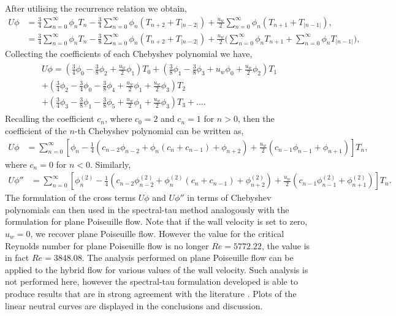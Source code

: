 \documentclass[a4paper, 12pt, twoside, openright]{article}
\numberwithin{equation}{section}
\begin{document}
After utilising the recurrence relation we obtain,
\begin{align}
U\phi &= \frac{3}{4}\sum_{n=0}^{\infty}\phi_n T_n - \frac{3}{4}\sum_{n=0}^{\infty}\phi_n\left(T_{n+2}+T_{|n-2|}\right)+\frac{u_w}{2}\sum_{n=0}^{\infty}\phi_n(T_{n+1}+T_{|n-1|})   , \\
 &= \frac{3}{4}\sum_{n=0}^{\infty}\phi_nT_n - \frac{3}{8}\sum_{n=0}^{\infty}\phi_n\left(T_{n+2}+T_{|n-2|}\right)+\frac{u_w}{2}\biggl(\sum_{n=0}^{\infty}\phi_nT_{n+1}+\sum_{n=0}^{\infty}\phi_nT_{|n-1|}\biggr) , 
\end{align}
Collecting the coefficients of each Chebyshev polynomial we have,
\begin{align}
\begin{split} 
U\phi = \left(\frac{3}{4}\phi_0 - \frac{3}{8}\phi_2+\frac{u_w}{2}\phi_1 \right)T_0 + \left(\frac{3}{8}\phi_1 - \frac{3}{8}\phi_3+ u_w\phi_0+\frac{u_w}{2}\phi_2\right)T_1 \\+ \left(\frac{3}{4}\phi_2 - \frac{3}{4}\phi_0 - \frac{3}{8}\phi_4 +\frac{u_w}{2}\phi_1+\frac{u_w}{2}\phi_3 \right)T_2 \\+ \left(\frac{3}{4}\phi_3 -\frac{3}{8}\phi_1 - \frac{3}{8}\phi_5 + \frac{u_w}{2}\phi_1 +\frac{u_w}{2}\phi_3 \right)T_3 + \dots.
\end{split}
\end{align}
Recalling the coefficient $c_n$, where $c_0=2$ and $c_n=1$ for $n>0$, then the coefficient of the $n$-th Chebyshev polynomial can be written as,  
\begin{align*}
U\phi &= \sum_{n=0}^{\infty} \left[\phi_n - \frac{1}{4}\left(c_{n-2}\phi_{n-2}+\phi_n\left(c_n + c_{n-1}\right) +\phi_{n+2}\right)+\frac{u_w}{2}\left(c_{n-1}\phi_{n-1}+\phi_{n+1}\right)\right]T_n,
\end{align*}
where $c_n=0$ for $n<0$. Similarly, 
\begin{align*}
U\phi'' &= \sum_{n=0}^{\infty} \left[\phi_n^{(2)} - \frac{1}{4}\left(c_{n-2}\phi_{n-2}^{(2)}+\phi_n^{(2)}\left(c_n + c_{n-1}\right) +\phi_{n+2}^{(2)}\right)+\frac{u_w}{2}\left(c_{n-1}\phi_{n-1}^{(2)}+\phi_{n+1}^{(2)}\right) \right]T_n.
\end{align*}
The formulation of the cross terms $U\phi$ and $U\phi''$ in terms of Chebyshev polynomials can then used in the spectral-tau method analogously with the formulation for plane Poiseuille flow. Note that if the wall velocity is set to zero, $u_w=0$, we recover plane Poiseuille flow. However the value for the critical Reynolds number for plane Poiseuille flow is no longer $Re=5772.22$, the value is in fact $Re=3848.08$. The analysis performed on plane Poiseuille flow can be applied to the hybrid flow for various values of the wall velocity. Such analysis is not performed here, however the spectral-tau formulation developed is able to produce results that are in strong agreement with the literature \cite{Potter66,ReynoldsPotter67}. Plots of the linear neutral curves are displayed in the conclusions and discussion. 
\end{document}
